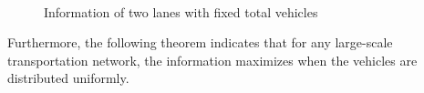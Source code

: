\documentclass[preprint,authoryear,12pt]{elsarticle}
\begin{document}
\begin{figure}[ht]
  \centering
  \\
  \caption{Information of two lanes with fixed total vehicles}
  \label{fig:info_twolane}
\end{figure}

Furthermore, the following theorem indicates that for any large-scale
transportation network, the information maximizes when the vehicles
are distributed uniformly.
\end{document}
